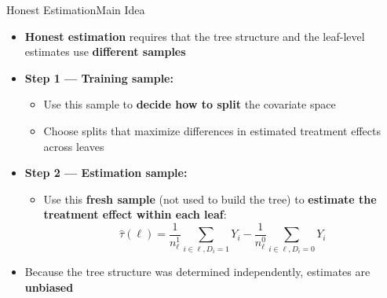 \documentclass[hyperref={pdfpagelabels=false}]{beamer}
\begin{document}
\begin{frame}{Honest Estimation}{Main Idea}
	\begin{itemize}
		\item \textbf{Honest estimation} requires that the tree structure and the leaf-level estimates use \textbf{different samples}
		\vspace{0.3cm}
		\item \textbf{Step 1 --- Training sample:}
		\vspace{0.2cm}
		\begin{itemize}
			\item Use this sample to \textbf{decide how to split} the covariate space
			\vspace{0.2cm}
			\item Choose splits that maximize differences in estimated treatment effects across leaves
		\end{itemize}
		\vspace{0.3cm}
		\item \textbf{Step 2 --- Estimation sample:}
		\vspace{0.2cm}
		\begin{itemize}
			\item Use this \textbf{fresh sample} (not used to build the tree) to \textbf{estimate the treatment effect within each leaf}:
			\begin{equation*}
				\hat{\tau}(\ell) = \frac{1}{n^{1}_\ell} \sum_{i \in \ell, D_i=1} Y_i - \frac{1}{n^{0}_\ell} \sum_{i \in \ell, D_i=0} Y_i
			\end{equation*}
		\end{itemize}
		\vspace{0.3cm}
		\item Because the tree structure was determined independently, estimates are \textbf{unbiased}
	\end{itemize}
\end{frame}
\end{document}
